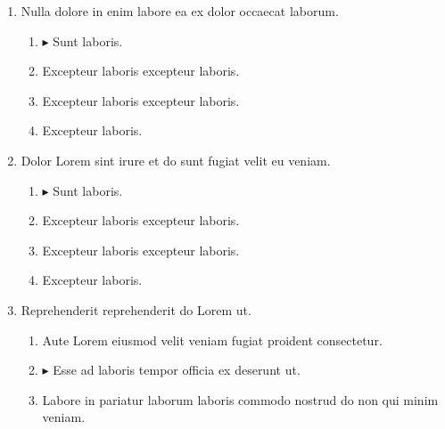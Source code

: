 \documentclass[a4paper,12pt]{article}
\begin{document}
\begin{enumerate}[label=\textbf{\arabic*.}]
\begin{multicols}{2}
\begin{enumerate}
	\end{enumerate}

\end{multicols}
\item Nulla dolore in enim labore ea ex dolor occaecat laborum.
\begin{multicols}{2}
	\begin{enumerate}
		\item $\blacktriangleright$  Sunt laboris.
    
		\item  Excepteur laboris excepteur laboris.
    
		\item  Excepteur laboris excepteur laboris.
  
		\item  Excepteur laboris.
    
	\end{enumerate}

\end{multicols}
\item Dolor Lorem sint irure et do sunt fugiat velit eu veniam.
\begin{multicols}{2}
	\begin{enumerate}
		\item $\blacktriangleright$  Sunt laboris.
    
		\item  Excepteur laboris excepteur laboris.
    
		\item  Excepteur laboris excepteur laboris.
  
		\item  Excepteur laboris.
    
	\end{enumerate}

\end{multicols}
\item Reprehenderit reprehenderit do Lorem ut.
\begin{multicols}{2}
	\begin{enumerate}
		\item  Aute Lorem eiusmod velit veniam fugiat proident consectetur.
  
		\item $\blacktriangleright$  Esse ad laboris tempor officia ex deserunt ut.
    
		\item  Labore in pariatur laborum laboris commodo nostrud do non qui minim veniam.
    

\end{enumerate}
\end{multicols}
\end{enumerate}
\end{document}
